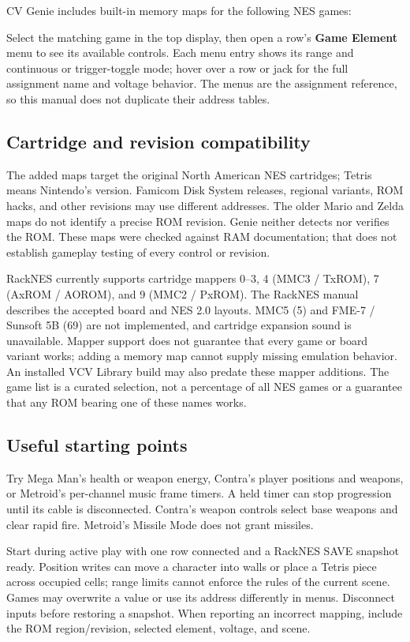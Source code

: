 CV Genie includes built-in memory maps for the following NES games:



Select the matching game in the top display, then open a row's
\textbf{Game Element} menu to see its available controls. Each menu entry
shows its range and continuous or trigger-toggle mode; hover over a row or
jack for the full assignment name and voltage behavior. The menus are the
assignment reference, so this manual does not duplicate their address tables.

\subsection{Cartridge and revision compatibility}
The added maps target the original North American NES cartridges; Tetris
means Nintendo's version. Famicom Disk System releases, regional variants,
ROM hacks, and other revisions may use different addresses. The older Mario
and Zelda maps do not identify a precise ROM revision. Genie neither detects
nor verifies the ROM. These maps were checked against RAM documentation;
that does not establish gameplay testing of every control or revision.

RackNES currently supports cartridge mappers 0--3, 4 (MMC3 / TxROM),
7 (AxROM / AOROM), and 9 (MMC2 / PxROM). The RackNES manual describes the
accepted board and NES 2.0 layouts. MMC5 (5) and FME-7 / Sunsoft 5B (69) are
not implemented, and cartridge expansion sound is unavailable.
Mapper support does not guarantee that every game or board variant works;
adding a memory map cannot supply missing emulation behavior. An installed
VCV Library build may also predate these mapper additions. The game list is a
curated selection, not a percentage of all NES games or a guarantee that any
ROM bearing one of these names works.

\subsection{Useful starting points}
Try Mega Man's health or weapon energy, Contra's player positions and weapons,
or Metroid's per-channel music frame timers. A held timer can stop progression
until its cable is disconnected. Contra's weapon controls select base weapons
and clear rapid fire. Metroid's Missile Mode does not grant missiles.

Start during active play with one row connected and a RackNES SAVE snapshot
ready. Position writes can move a character into walls or place a Tetris piece
across occupied cells; range limits cannot enforce the rules of the current
scene. Games may overwrite a value or use its address differently in menus.
Disconnect inputs before restoring a snapshot. When reporting an incorrect
mapping, include the ROM region/revision, selected element, voltage, and scene.
